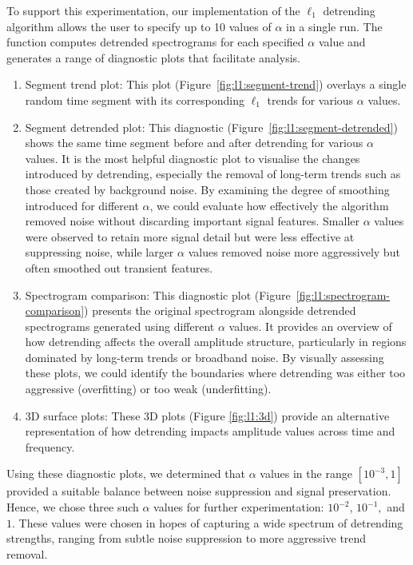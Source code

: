 To support this experimentation, our implementation of the $\ell_1$ detrending algorithm allows the user to specify up to 10 values of $\alpha$ in a single run. The function computes detrended spectrograms for each specified $\alpha$ value and generates a range of diagnostic plots that facilitate analysis. 
\begin{enumerate}
    \item Segment trend plot: This plot (Figure~\ref{fig:l1:segment-trend}) overlays a single random time segment with its corresponding $\ell_1$ trends for various $\alpha$ values. 
    \item Segment detrended plot: This diagnostic (Figure~\ref{fig:l1:segment-detrended}) shows the same time segment before and after detrending for various $\alpha$ values. It is the most helpful diagnostic plot to visualise the changes introduced by detrending, especially the removal of long-term trends such as those created by background noise. By examining the degree of smoothing introduced for different $\alpha$, we could evaluate how effectively the algorithm removed noise without discarding important signal features. Smaller $\alpha$ values were observed to retain more signal detail but were less effective at suppressing noise, while larger $\alpha$ values removed noise more aggressively but often smoothed out transient features.
    \item Spectrogram comparison: This diagnostic plot (Figure~\ref{fig:l1:spectrogram-comparison}) presents the original spectrogram alongside detrended spectrograms generated using different $\alpha$ values. It provides an overview of how detrending affects the overall amplitude structure, particularly in regions dominated by long-term trends or broadband noise. By visually assessing these plots, we could identify the boundaries where detrending was either too aggressive (overfitting) or too weak (underfitting).
    \item 3D surface plots: These 3D plots (Figure \ref{fig:l1:3d}) provide an alternative representation of how detrending impacts amplitude values across time and frequency.
\end{enumerate}

Using these diagnostic plots, we determined that $\alpha$ values in the range $[10^{-3}, 1]$ provided a suitable balance between noise suppression and signal preservation. Hence, we chose three such $\alpha$ values for further experimentation: $10^{-2}$, $10^{-1},$ and $1$. These values were chosen in hopes of capturing a wide spectrum of detrending strengths, ranging from subtle noise suppression to more aggressive trend removal.

